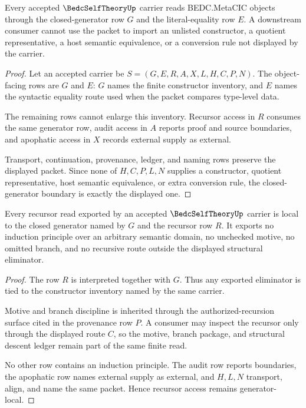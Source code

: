 \begin{theorem}
\label{thm:bedc-self-theory-closed-generator-boundary}
Every accepted $\BedcSelfTheoryUp$ carrier reads BEDC.MetaCIC objects through the closed-generator row $G$ and the literal-equality row $E$. A downstream consumer cannot use the packet to import an unlisted constructor, a quotient representative, a host semantic equivalence, or a conversion rule not displayed by the carrier.
\end{theorem}
\begin{proof}
Let an accepted carrier be $S=(G,E,R,A,X,L,H,C,P,N)$. The object-facing rows are $G$ and $E$: $G$ names the finite constructor inventory, and $E$ names the syntactic equality route used when the packet compares type-level data.

The remaining rows cannot enlarge this inventory. Recursor access in $R$ consumes the same generator row, audit access in $A$ reports proof and source boundaries, and apophatic access in $X$ records external supply as external.

Transport, continuation, provenance, ledger, and naming rows preserve the displayed packet. Since none of $H,C,P,L,N$ supplies a constructor, quotient representative, host semantic equivalence, or extra conversion rule, the closed-generator boundary is exactly the displayed one.
\end{proof}

\begin{theorem}
\label{thm:bedc-self-theory-structural-recursor-locality}
Every recursor read exported by an accepted $\BedcSelfTheoryUp$ carrier is local to the closed generator named by $G$ and the recursor row $R$. It exports no induction principle over an arbitrary semantic domain, no unchecked motive, no omitted branch, and no recursive route outside the displayed structural eliminator.
\end{theorem}
\begin{proof}
The row $R$ is interpreted together with $G$. Thus any exported eliminator is tied to the constructor inventory named by the same carrier.

Motive and branch discipline is inherited through the authorized-recursion surface cited in the provenance row $P$. A consumer may inspect the recursor only through the displayed route $C$, so the motive, branch package, and structural descent ledger remain part of the same finite read.

No other row contains an induction principle. The audit row reports boundaries, the apophatic row names external supply as external, and $H,L,N$ transport, align, and name the same packet. Hence recursor access remains generator-local.
\end{proof}


